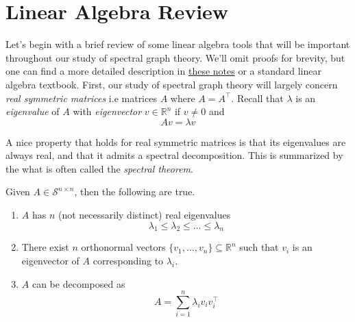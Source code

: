 
\section{Linear Algebra Review}

Let's begin with a brief review of some linear algebra tools that will be important throughout our study of spectral graph theory. We'll omit proofs for brevity, but one can find a more detailed description in \href{https://antaresc.github.io/src/documents/ugtcs/bwca-linalg-review.pdf}{these notes} or a standard linear algebra textbook. First, our study of spectral graph theory will largely concern \emph{real symmetric matrices} i.e matrices $A$ where $A = A^\top$. Recall that $\lambda$ is an \emph{eigenvalue} of $A$ with \emph{eigenvector} $v \in \mathbb{R}^n$ if $v \neq 0$ and
\begin{equation*}
Av = \lambda v
\end{equation*}

A nice property that holds for real symmetric matrices is that its eigenvalues are always real, and that it admits a spectral decomposition. This is summarized by the what is often called the \emph{spectral theorem}.

\begin{theorem}
Given $A \in \mathcal{S}^{n \times n}$, then the following are true.
\vspace{-1em}
\begin{enumerate}[1.]
  \item $A$ has $n$ (not necessarily distinct) real eigenvalues
  \begin{equation*}
    \lambda_1 \leq \lambda_2 \leq \ldots \leq \lambda_n
  \end{equation*}

  \item There exist $n$ orthonormal vectors $\{ v_1, \ldots, v_n \} \subseteq \mathbb{R}^n$ such that $v_i$ is an eigenvector of $A$ corresponding to $\lambda_i$.

  \item $A$ can be decomposed as
  \begin{equation*}
    A = \sum_{i=1}^n \lambda_i v_i v_i^\top
  \end{equation*}
\end{enumerate}
\end{theorem}


